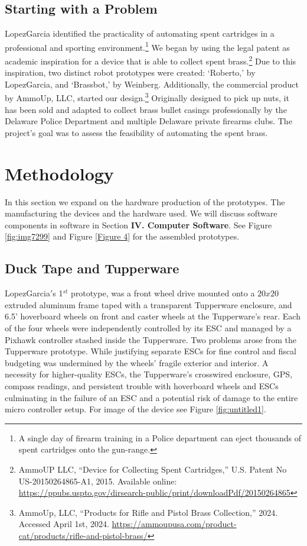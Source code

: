 \documentclass{scrarticle}
\begin{document}
\subsection{Starting with a Problem}
LopezGarcia identified the practicality of automating spent cartridges in a professional and sporting environment.\footnote{A single day of firearm training in a Police department can eject thousands of spent cartridges onto the gun-range.}
We began by using the legal patent as academic inspiration for a device that is able to collect spent brass.\footnote{AmmoUP LLC, ``Device for Collecting Spent Cartridges,'' U.S. Patent No US-20150264865-A1, 2015. Available online: \url{https://ppubs.uspto.gov/dirsearch-public/print/downloadPdf/20150264865}} Due to this inspiration, two distinct robot prototypes were created: `Roberto,' by LopezGarcia, and `Brassbot,' by Weinberg. Additionally, the commercial product by AmmoUp, LLC, started our design.\footnote{AmmoUp, LLC, ``Products for Rifle and Pistol Brass Collection,'' 2024. Accessed April 1st, 2024. \url{https://ammoupusa.com/product-cat/products/rifle-and-pistol-brass/}} Originally designed to pick up nuts, it has been sold and adapted to collect brass bullet casings professionally by the Delaware Police Department and multiple Delaware private firearms clubs. The project's goal was to assess the feasibility of automating the spent brass.


\section{Methodology}
In this section we expand on the hardware production of  the prototypes. The manufacturing the devices and the hardware used. We will discuss software components in software in Section {\textbf{IV. Computer Software}}. See Figure \ref{fig:img7299} and Figure \ref{Figure 4} for the assembled prototypes. 

\subsection{Duck Tape and Tupperware}
LopezGarcia$'$s 1$^{st}$ prototype, was a front wheel drive mounted onto a $20x20$ extruded aluminum frame taped with a transparent Tupperware enclosure, and 6.5' hoverboard wheels on front and caster wheels at the Tupperware's rear. Each of the four wheels were independently controlled by its ESC and managed by a Pixhawk controller stashed inside the Tupperware. Two problems arose from the Tupperware prototype. While justifying separate ESCs for fine control and fiscal budgeting was undermined by the wheels' fragile exterior and interior. A necessity for higher-quality ESCs, the Tupperware's crosswired enclosure, GPS, compass readings, and persistent trouble with hoverboard wheels and ESCs culminating in the failure of an ESC and a potential risk of damage to the entire micro controller setup. For image of the device see Figure \ref{fig:untitled1}.
\end{document}
